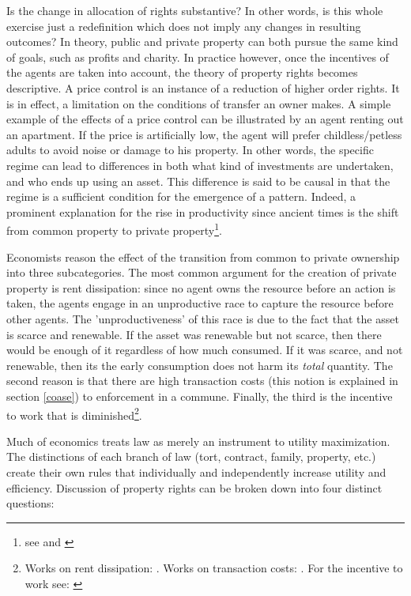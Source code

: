 Is the change in allocation of rights substantive? In other words, is this whole exercise just a redefinition which does not imply any changes in resulting outcomes? In theory, public and private property can both pursue the same kind of goals, such as profits and charity. In practice however, once the incentives of the agents are taken into account, the theory of property rights becomes descriptive. A price control is an instance of a reduction of higher order rights. It is in effect, a limitation on the conditions of transfer an owner makes. A simple example of the effects of a price control can be illustrated by an agent renting out an apartment. If the price is artificially low, the agent will prefer childless/petless adults to avoid noise or damage to his property. In other words, the specific regime can lead to differences in both what kind of investments are undertaken, and who ends up using an asset. This difference is said to be causal in that the regime is a sufficient condition for the emergence of a pattern. Indeed, a prominent explanation for the rise in productivity since ancient times is the shift from common property to private property\footnote{see \cite{anderson1983privatizing} and \cite{north1973rise}}.

Economists reason the effect of the transition from common to private ownership into three subcategories. The most common argument for the creation of private property is rent dissipation: since no agent owns the resource before an action is taken, the agents engage in an unproductive race to capture the resource before other agents. The 'unproductiveness' of this race is due to the fact that the asset is scarce and renewable. If the asset was renewable but not scarce, then there would be enough of it regardless of how much consumed. If it was scarce, and not renewable, then its the early consumption does not harm its \textit{total} quantity. The second reason is that there are high transaction costs (this notion is explained in section \ref{coase}) to enforcement in a commune. Finally, the third is the incentive to work that is diminished\footnote{ Works on rent dissipation:\cite{dasgupta1979economic} \cite{gordon1954economic} \cite{Cheung1970} \cite{schaefer1957some} \cite{scott1955fishery} \cite{clark1990optimal}. Works on transaction costs: \cite{coase1960problem} \cite{demsetz1983structure}. For the incentive to work see: \cite{north1990} }.

Much of economics treats law as merely an instrument to utility maximization. The distinctions of each branch of law (tort, contract, family, property, etc.) create their own rules that individually and independently increase utility and efficiency. Discussion of property rights can be broken down into four distinct questions:

